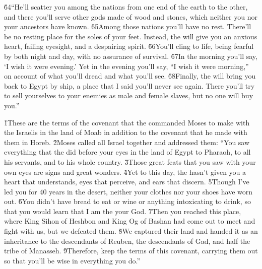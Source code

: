 \v{64}``He'll scatter you among the nations from one end of the earth to the other, and there you'll serve other gods made of wood and stones, which neither you nor your ancestors have known. \v{65}Among those nations you'll have no rest. There'll be no resting place for the soles of your feet. Instead, the  will give you an anxious heart, failing eyesight, and a despairing spirit. \v{66}You'll cling to life, being fearful by both night and day, with no assurance of survival. \v{67}In the morning you'll say, `I wish it were evening.' Yet in the evening you'll say, ``I wish it were morning,'' on account of what you'll dread and what you'll see. \v{68}Finally, the  will bring you back to Egypt by ship, a place that I said you'll never see again. There you'll try to sell yourselves to your enemies as male and female slaves, but no one will buy you.''

\v{1}These are the terms of the covenant that the  commanded Moses to make with the Israelis in the land of Moab in addition to the covenant that he made with them in Horeb. \v{2}Moses called all Israel together and addressed them: ``You saw everything that the  did before your eyes in the land of Egypt to Pharaoh, to all his servants, and to his whole country. \v{3}Those great feats that you saw with your own eyes are signs and great wonders. \v{4}Yet to this day, the  hasn't given you a heart that understands, eyes that perceive, and ears that discern. \v{5}Though I've led you for 40 years in the desert, neither your clothes nor your shoes have worn out. \v{6}You didn't have bread to eat or wine or anything intoxicating to drink, so that you would learn that I am the  your God. \v{7}Then you reached this place, where King Sihon of Heshbon and King Og of Bashan had come out to meet and fight with us, but we defeated them. \v{8}We captured their land and handed it as an inheritance to the descendants of Reuben, the descendants of Gad, and half the tribe of Manasseh. \v{9}Therefore, keep the terms of this covenant, carrying them out so that you'll be wise in everything you do.''

